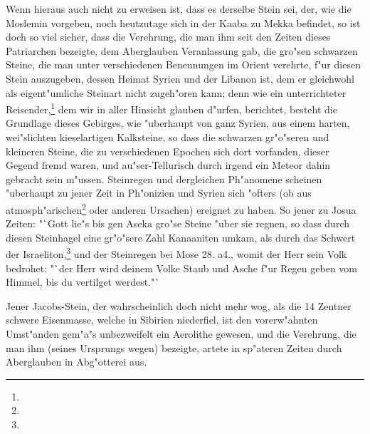 \documentclass[a4paper, 11pt, oneside, polutonikogreek, german]{article}
\begin{document}
Wenn hieraus auch nicht zu erweisen ist, dass es derselbe Stein sei, der, wie die Moslemin vorgeben, noch heutzutage sich in der Kaaba zu Mekka befindet, so ist doch so viel sicher, dass die Verehrung, die man ihm seit den Zeiten dieses Patriarchen bezeigte, dem Aberglauben Veranlassung gab, die gro"sen schwarzen Steine, die man unter verschiedenen Benennungen im Orient verehrte, f"ur diesen Stein auszugeben, dessen Heimat Syrien und der Libanon ist, dem er gleichwohl als eigent"umliche Steinart nicht zugeh"oren kann; denn wie ein unterrichteter Reisender,\footnote{} dem wir in aller Hinsicht glauben d"urfen, berichtet, besteht die Grundlage dieses Gebirges, wie "uberhaupt von ganz Syrien, aus einem harten, wei"slichten kieselartigen Kalksteine, so dass die schwarzen gr"o"seren und kleineren Steine, die zu verschiedenen Epochen sich dort vorfanden, dieser Gegend fremd waren, und au"ser-Tellurisch durch irgend ein Meteor dahin gebracht sein m"ussen. Steinregen und dergleichen Ph"anomene scheinen "uberhaupt zu jener Zeit in Ph"onizien und Syrien sich "ofters (ob aus atmosph"arischen\footnote{} oder anderen Ursachen) ereignet zu haben. So jener zu Josua Zeiten: "`Gott lie"s bis gen Aseka gro"se Steine "uber sie regnen, so dass durch diesen Steinhagel eine gr"o"sere Zahl Kanaaniten umkam, als durch das Schwert der Israeliton,\footnote{} und der Steinregen bei Mose 28. a4., womit der Herr sein Volk bedrohet: "`der Herr wird deinem Volke Staub und Asche f"ur Regen geben vom Himmel, bis du vertilget werdest."`

Jener Jacobs-Stein, der wahrscheinlich doch nicht mehr wog, als die 14 Zentner schwere Eisenmasse, welche in Sibirien niederfiel, ist den vorerw"ahnten Umst"anden gem"a"s unbezweifelt ein Aerolithe gewesen, und die Verehrung, die man ihm (seines Ursprungs wegen) bezeigte, artete in sp"ateren Zeiten durch Aberglauben in Abg"otterei aus.
\end{document}
